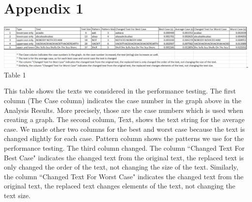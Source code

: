 \documentclass{article}
\begin{document}
\section{\textbf{Appendix 1}} 
\begin{center}
\includegraphics[scale = 0.18]{table} \\
\scriptsize{Table 1}
\end{center}
\indent This table shows the texts we considered in the performance testing. The first column (The Case column) indicates the case number in the graph above in the Analysis Results. More precisely, those are the case numbers which is used when creating a graph. The second column, Text, shows the text string for the average case. We made other two columns for the best and worst case because the text is changed slightly for each case. Pattern column shows the patterns we use for the performance testing. The third column changed. The column ``Changed Text For Best Case" indicates the changed text from the original text, the replaced text is only changed the order of the text, not changing the size of the text. Similarly, the column ``Changed Text For Worst Case" indicates the changed text from the original text, the replaced text changes elements of the text, not changing the text size. 
\end{document}
